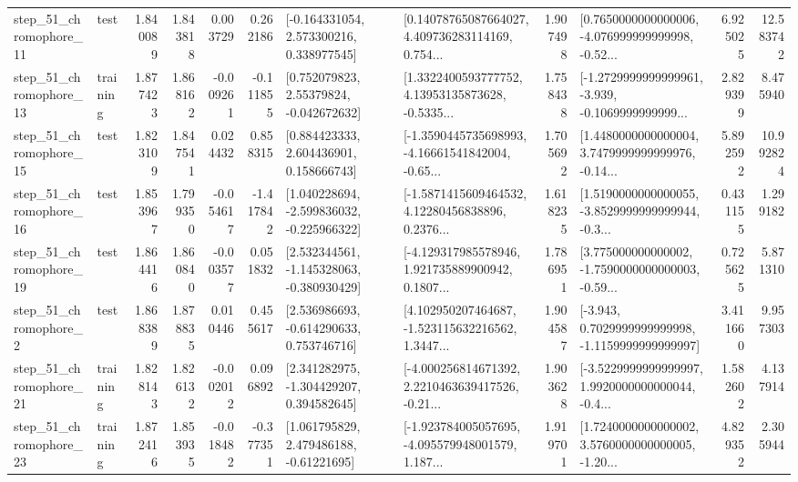 \begin{tabular}{llrrrrllrlrr}
   step\_51\_chromophore\_11 &      test &      1.840089 &    1.843818 &      0.003729 &  0.262186 &    [-0.164331054, 2.573300216, 0.338977545] &  [0.14078765087664027, 4.409736283114169, 0.754... &       1.907498 &  [0.7650000000000006, -4.076999999999998, -0.52... &            6.925025 &         12.583742 \\
   step\_51\_chromophore\_13 &  training &      1.877423 &    1.868162 &     -0.009261 & -0.111855 &     [0.752079823, 2.55379824, -0.042672632] &  [1.3322400593777752, 4.13953135873628, -0.5335... &       1.758438 &  [-1.2729999999999961, -3.939, -0.1069999999999... &            2.829399 &          8.475940 \\
   step\_51\_chromophore\_15 &      test &      1.823109 &    1.847541 &      0.024432 &  0.858315 &     [0.884423333, 2.604436901, 0.158666743] &  [-1.3590445735698993, -4.16661541842004, -0.65... &       1.705692 &  [1.4480000000000004, 3.7479999999999976, -0.14... &            5.892592 &         10.992824 \\
   step\_51\_chromophore\_16 &      test &      1.853967 &    1.799350 &     -0.054617 & -1.417842 &   [1.040228694, -2.599836032, -0.225966322] &  [-1.5871415609464532, 4.12280456838896, 0.2376... &       1.618235 &  [1.5190000000000055, -3.8529999999999944, -0.3... &            0.431155 &          1.299182 \\
   step\_51\_chromophore\_19 &      test &      1.864416 &    1.860840 &     -0.003577 &  0.051832 &   [2.532344561, -1.145328063, -0.380930429] &  [-4.129317985578946, 1.921735889900942, 0.1807... &       1.786951 &  [3.775000000000002, -1.7590000000000003, -0.59... &            0.725625 &          5.871310 \\
    step\_51\_chromophore\_2 &      test &      1.868389 &    1.878835 &      0.010446 &  0.455617 &    [2.536986693, -0.614290633, 0.753746716] &  [4.102950207464687, -1.523115632216562, 1.3447... &       1.904587 &  [-3.943, 0.7029999999999998, -1.1159999999999997] &            3.411660 &          9.957303 \\
   step\_51\_chromophore\_21 &  training &      1.828143 &    1.826132 &     -0.002012 &  0.096892 &    [2.341282975, -1.304429207, 0.394582645] &  [-4.000256814671392, 2.2210463639417526, -0.21... &       1.903628 &  [-3.5229999999999997, 1.9920000000000044, -0.4... &            1.582602 &          4.137914 \\
   step\_51\_chromophore\_23 &  training &      1.872416 &    1.853935 &     -0.018482 & -0.377351 &     [1.061795829, 2.479486188, -0.61221695] &  [-1.923784005057695, -4.095579948001579, 1.187... &       1.919701 &  [1.7240000000000002, 3.5760000000000005, -1.20... &            4.829352 &          2.305944 \\

\end{tabular}

